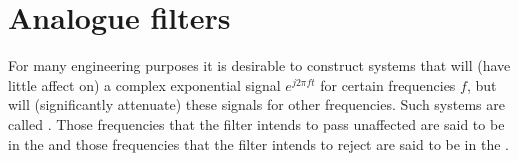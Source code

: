 

\section{Analogue filters} \label{sec:analogue-filters}


For many engineering purposes it is desirable to construct systems that will  (have little affect on) a complex exponential signal $e^{j2\pi f t}$ for certain frequencies $f$, but will  (significantly attenuate) these signals for other frequencies.  Such systems are called .  Those frequencies that the filter intends to pass unaffected are said to be in the  and those frequencies that the filter intends to reject are said to be in the .

